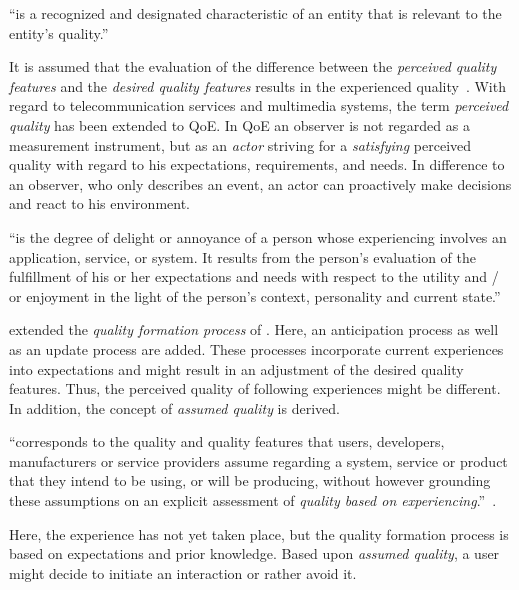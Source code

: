 \begin{definition}
``is a recognized and designated characteristic of an entity that is relevant to the entity's quality.''~\citep[][p.\,17]{jekosch_voice_2005}
\end{definition}

It is assumed that the evaluation of the difference between the \emph{perceived quality features} and the \emph{desired quality features} results in the experienced quality~\citep[p.\,23]{raake_quality_2014}.
With regard to telecommunication services and multimedia systems, the term \emph{perceived quality} has been extended to \acf{QoE}.
In \ac{QoE} an observer is not regarded as a measurement instrument, but as an \emph{actor} striving for a \emph{satisfying} perceived quality with regard to his expectations, requirements,  and needs.
In difference to an observer, who only describes an event, an actor can proactively make decisions and react to his environment.  

\begin{definition}
``is the degree of delight or annoyance of a person whose experiencing involves an application, service, or system.
It results from the person’s evaluation of the fulfillment of his or her expectations and needs with respect to the utility and / or enjoyment in the light of the person’s context, personality and current state.''~\citep[][p.\,19]{raake_quality_2014}
\end{definition}

\citet{raake_quality_2014} extended the \emph{quality formation process} of \citet{jekosch_voice_2005}.
Here, an anticipation process as well as an update process are added.
These processes incorporate current experiences into expectations and might result in an adjustment of the desired quality features.
Thus, the perceived quality of following experiences might be different.
In addition, the concept of \emph{assumed quality} is derived.
\begin{definition}\label{def:assumedquality}
``corresponds to the quality and quality features that users, developers, manufacturers or service providers assume regarding a system, service or product that they intend to be using, or will be producing, without however grounding these assumptions on an explicit assessment of \textit{quality based on experiencing}.''~\citep[][p.\,17]{raake_quality_2014}.
\end{definition}
Here, the experience has not yet taken place, but the quality formation process is based on expectations and prior knowledge.
Based upon \emph{assumed quality}, a user might decide to initiate an interaction or rather avoid it.

